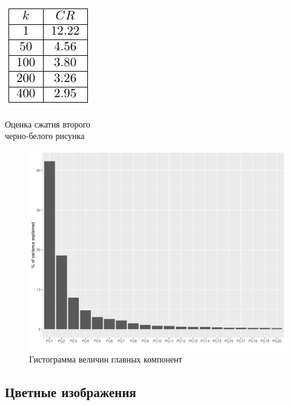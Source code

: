 \documentclass[a4paper]{article}
\begin{document}
\begin{table}[H]
    \centering
    \includegraphics[]{tables/CR_for_Adams_The_Tetons_and_the_Snake_River.pdf}
    \caption{Оценка сжатия второго\\черно-белого рисунка}
    \label{tab:mount}
\end{table}
\begin{figure}[H]
    \centering
    \includegraphics[width = \textwidth]{hists/hist_for_Adams_The_Tetons_and_the_Snake_River.pdf}
    \caption{Гистограмма величин главных компонент}
    \label{fig:mount_hist}
\end{figure}
\subsection{Цветные изображения}
\end{document}
